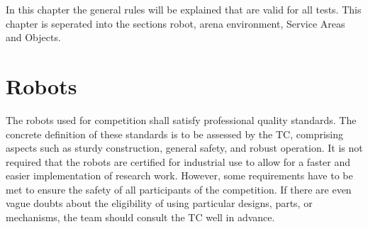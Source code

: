 
In this chapter the general rules will be explained that are valid for all tests. This chapter is seperated into the sections robot, arena environment, Service Areas and Objects.

%
%

\section{Robots}
The robots used for competition shall satisfy professional quality standards. The concrete definition of these standards is to be assessed by the TC, comprising aspects such as sturdy construction, general safety, and robust operation. It is not required that the robots are certified for industrial use to allow for a faster and easier implementation of research work. However, some requirements have to be met to ensure the safety of all participants of the competition. If there are even vague doubts about the eligibility of using particular designs, parts, or mechanisms, the team should consult the TC well in advance.

